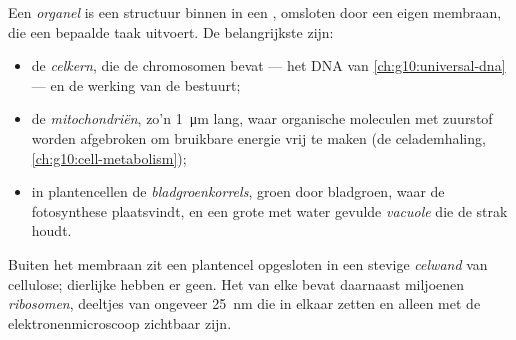 \begin{definition}[Organel]\label{def:g10:cells-common-unit:organelle}
Een \emph{organel} is een structuur binnen in een ,
omsloten door een eigen membraan, die een bepaalde taak uitvoert. De
belangrijkste zijn:
\begin{itemize}
  \item de \emph{celkern}, die de chromosomen bevat ---
        het DNA van \cref{ch:g10:universal-dna} --- en de werking van de
         bestuurt;
  \item de \emph{mitochondriën}, zo'n
        \qty{1}{\micro m} lang, waar organische moleculen met zuurstof
        worden afgebroken om bruikbare energie vrij te maken (de
        celademhaling, \cref{ch:g10:cell-metabolism});
  \item in plantencellen de \emph{bladgroenkorrels},
        groen door bladgroen, waar de fotosynthese plaatsvindt, en een
        grote met water gevulde \emph{vacuole} die de 
        strak houdt.
\end{itemize}
Buiten het membraan zit een plantencel opgesloten in een stevige
\emph{celwand} van cellulose; dierlijke  hebben er
geen. Het  van elke  bevat daarnaast miljoenen
\emph{ribosomen}, deeltjes van ongeveer \qty{25}{nm} die
 in elkaar zetten en alleen met de elektronenmicroscoop
zichtbaar zijn.
\end{definition}

